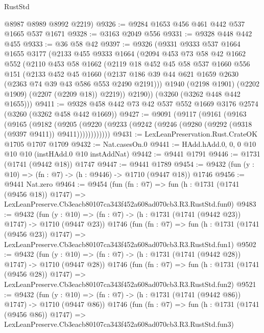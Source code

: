 \begin{lexlean}{RustStd}
\begin{coremodule}
      @8987
      @8989
      @8992
      @2219)
@9326 := @9284 @1653 @456 @461 @442 @537 @1665 @537 @1671
@9328 := @3163 @2049 @556
@9331 := @9328 @448 @442 @455
@9333 := @36 @58 @42
@9397 := @9326
    (@9331
      @9333
      @537
      @1664
      @1655
      @3177
      (@2133
        @455
        @9333
        @1664
        (@2094
          @453
          @73
          @58
          @42
          @1662
          @552
          (@2110
            @453
            @58
            @1662
            (@2119
              @18
              @452
              @45
              @58
              @537
              @1660
              @556
              @151
              (@2133
                @452
                @45
                @1660
                (@2137 @186 @39 @44 @621 @1659 @2630 (@2363 @74 @39 @43 @586 @553 @2490 @2191)))
              @1940
              (@2198 @1901)
              (@2202 @1909)
              (@2207 (@2209 @18))
              @2219))
          @2190))
      (@3260 (@3262 @448 @442 @1655)))
@9411 := @9328 @458 @442 @73 @42 @537 @552 @1669 @3176 @2574 (@3260 (@3262 @458 @442 @1669))
@9427 := @9091
    (@9117
      (@9161
        (@9163
          (@9165
            (@9182
              (@9205
                (@9220 (@9233 (@9242 (@9246 (@9280 (@9292 (@9318 (@9397 @9411)) @9411))))))))))))
@9431 := LexLeanPreservation.Rust.CrateOK @1705 @1707 @1709
@9432 := Nat.casesOn.{0}
@9441 := HAdd.hAdd.{0, 0, 0} @10 @10 @10 (instHAdd.{0} @10 instAddNat)
@9442 := @9441 @1791
@9446 := @1731 (@1741 (@9442 @18)) @1747
@9447 := @9441 @1789
@9454 := @9432 (fun (y : @10) => (fn : @7) -> (h : @9446) -> @1710 (@9447 @18)) @1746
@9456 := @9441 Nat.zero
@9464 := @9454
    (fun (fn : @7) =>
    fun (h : @1731 (@1741 (@9456 @18)) @1747) =>
    LexLeanPreserve.Cb3eacb80107ca343f452a608ad070cb3.R3.RustStd.fun0)
@9483 := @9432
    (fun (y : @10) => (fn : @7) -> (h : @1731 (@1741 (@9442 @23)) @1747) -> @1710 (@9447 @23))
    @1746
    (fun (fn : @7) =>
    fun (h : @1731 (@1741 (@9456 @23)) @1747) =>
    LexLeanPreserve.Cb3eacb80107ca343f452a608ad070cb3.R3.RustStd.fun1)
@9502 := @9432
    (fun (y : @10) => (fn : @7) -> (h : @1731 (@1741 (@9442 @28)) @1747) -> @1710 (@9447 @28))
    @1746
    (fun (fn : @7) =>
    fun (h : @1731 (@1741 (@9456 @28)) @1747) =>
    LexLeanPreserve.Cb3eacb80107ca343f452a608ad070cb3.R3.RustStd.fun2)
@9521 := @9432
    (fun (y : @10) => (fn : @7) -> (h : @1731 (@1741 (@9442 @86)) @1747) -> @1710 (@9447 @86))
    @1746
    (fun (fn : @7) =>
    fun (h : @1731 (@1741 (@9456 @86)) @1747) =>
    LexLeanPreserve.Cb3eacb80107ca343f452a608ad070cb3.R3.RustStd.fun3)

\end{coremodule}
\end{lexlean}
